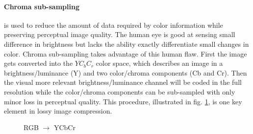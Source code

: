 \paragraph{Chroma sub-sampling} is used to reduce the amount of data required by
color information while preserving perceptual image quality. 
The human eye is good at sensing small difference in brightness but lacks the
ability exactly differentiate small changes in color. Chroma sub-sampling takes
advantage of this human flaw. First the image gets converted into the $YC_bC_r$
color space, which describes an image in a brightness/luminance (Y) and two
color/chroma components (Cb and Cr). Then the visual more relevant
brightness/luminance channel will be coded in the full resolution while the
color/chroma components can be sub-sampled with only minor loss in perceptual
quality. This procedure, illustrated in fig. \ref{fig:YCbCr}, is one key element
in lossy image compression. 
\begin{figure}[h]
\centering
{}
\hspace{5mm}
\hspace{5mm}
\caption{RGB $\rightarrow$ YCbCr}
\label{fig:YCbCr}
\end{figure}


